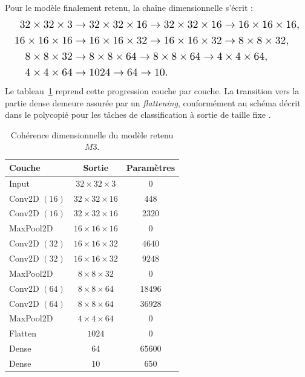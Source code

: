 Pour le mod\`ele finalement retenu, la cha\^ine dimensionnelle s'\'ecrit :
\begin{equation}
\resizebox{0.98\columnwidth}{!}{$
\begin{aligned}
32\times 32\times 3 &\rightarrow 32\times 32\times 16 \rightarrow 32\times 32\times 16 \rightarrow 16\times 16\times 16, \\
16\times 16\times 16 &\rightarrow 16\times 16\times 32 \rightarrow 16\times 16\times 32 \rightarrow 8\times 8\times 32, \\
8\times 8\times 32 &\rightarrow 8\times 8\times 64 \rightarrow 8\times 8\times 64 \rightarrow 4\times 4\times 64, \\
4\times 4\times 64 &\rightarrow 1024 \rightarrow 64 \rightarrow 10.
\end{aligned}$}
\end{equation}
Le tableau~\ref{tab:section6_dimensions} reprend cette progression couche par couche. La transition vers la partie dense demeure assur\'ee par un \textit{flattening}, conform\'ement au sch\'ema d\'ecrit dans le polycopi\'e pour les t\^aches de classification \`a sortie de taille fixe \cite{poly_chap4_classifml}.

\begin{table}[htbp]
\centering
\caption{Coh\'erence dimensionnelle du mod\`ele retenu $M3$.}
\label{tab:section6_dimensions}
\small
\begin{tabular}{|l|c|c|}
\hline
Couche & Sortie & Param\`etres \\
\hline
Input & $32\times 32\times 3$ & $0$ \\
Conv2D $(16)$ & $32\times 32\times 16$ & $448$ \\
Conv2D $(16)$ & $32\times 32\times 16$ & $2320$ \\
MaxPool2D & $16\times 16\times 16$ & $0$ \\
Conv2D $(32)$ & $16\times 16\times 32$ & $4640$ \\
Conv2D $(32)$ & $16\times 16\times 32$ & $9248$ \\
MaxPool2D & $8\times 8\times 32$ & $0$ \\
Conv2D $(64)$ & $8\times 8\times 64$ & $18496$ \\
Conv2D $(64)$ & $8\times 8\times 64$ & $36928$ \\
MaxPool2D & $4\times 4\times 64$ & $0$ \\
Flatten & $1024$ & $0$ \\
Dense & $64$ & $65600$ \\
Dense & $10$ & $650$ \\
\hline
\end{tabular}
\end{table}

